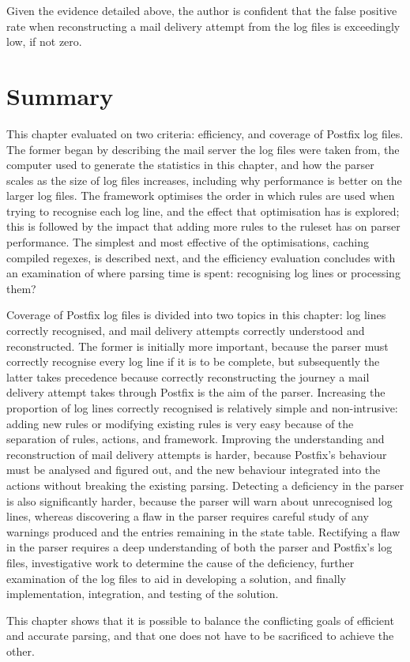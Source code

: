 Given the evidence detailed above, the author is confident that the false
positive rate when reconstructing a mail delivery attempt from the
\numberOFlogFILES{} log files is exceedingly low, if not zero.

\section{Summary}

This chapter evaluated \parsername{} on two criteria: efficiency, and
coverage of Postfix log files.  The former began by describing the mail
server the log files were taken from, the computer used to generate the
statistics in this chapter, and how the parser scales as the size of log
files increases, including why performance is better on the larger log
files.  The framework optimises the order in which rules are used when
trying to recognise each log line, and the effect that optimisation has is
explored; this is followed by the impact that adding more rules to the
ruleset has on parser performance.  The simplest and most effective of the
optimisations, caching compiled regexes, is described next, and the
efficiency evaluation concludes with an examination of where parsing time
is spent: recognising log lines or processing them?

Coverage of Postfix log files is divided into two topics in this chapter:
log lines correctly recognised, and mail delivery attempts correctly
understood and reconstructed.  The former is initially more important,
because the parser must correctly recognise every log line if it is to be
complete, but subsequently the latter takes precedence because correctly
reconstructing the journey a mail delivery attempt takes through Postfix is
the aim of the parser.  Increasing the proportion of log lines correctly
recognised is relatively simple and non-intrusive: adding new rules or
modifying existing rules is very easy because of the separation of rules,
actions, and framework.  Improving the understanding and reconstruction of
mail delivery attempts is harder, because Postfix's behaviour must be
analysed and figured out, and the new behaviour integrated into the actions
without breaking the existing parsing.  Detecting a deficiency in the
parser is also significantly harder, because the parser will warn about
unrecognised log lines, whereas discovering a flaw in the parser requires
careful study of any warnings produced and the entries remaining in the
state table.  Rectifying a flaw in the parser requires a deep understanding
of both the parser and Postfix's log files, investigative work to determine
the cause of the deficiency, further examination of the log files to aid in
developing a solution, and finally implementation, integration, and testing
of the solution.

This chapter shows that it is possible to balance the conflicting goals of
efficient and accurate parsing, and that one does not have to be sacrificed
to achieve the other.
